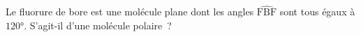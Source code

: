Le fluorure de bore  est une molécule plane dont les angles
$\widehat{\text{FBF}}$ sont tous égaux à $\ang{120}$. S'agit-il d'une
molécule polaire~?

